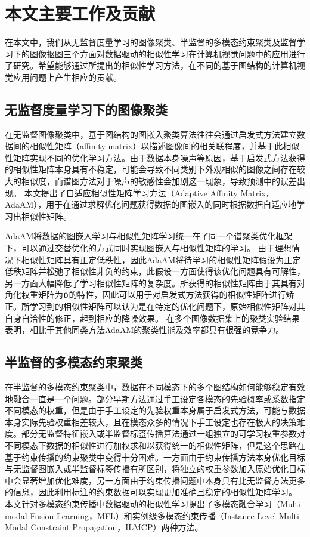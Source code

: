 \section{本文主要工作及贡献}
在本文中，我们从无监督度量学习的图像聚类、半监督的多模态约束聚类及监督学习下的图像抠图三个方面对数据驱动的相似性学习在计算机视觉问题中的应用进行了研究。希望能够通过所提出的相似性学习方法，在不同的基于图结构的计算机视觉应用问题上产生相应的贡献。

\subsection{无监督度量学习下的图像聚类}
在无监督图像聚类中，基于图结构的图嵌入聚类算法往往会通过启发式方法建立数据间的相似性矩阵（affinity matrix）以描述图像间的相关联程度，并基于此相似性矩阵实现不同的优化学习方法。由于数据本身噪声等原因，基于启发式方法获得的相似性矩阵本身具有不稳定，可能会导致不同类别下外观相似的图像之间存在较大的相似度，而谱图方法对于噪声的敏感性会加剧这一现象，导致预测中的误差出现。        
本文提出了自适应相似性矩阵学习方法（Adaptive Affinity Matrix，AdaAM），用于在通过求解优化问题获得数据的图嵌入的同时根据数据自适应地学习出相似性矩阵。

AdaAM将数据的图嵌入学习与相似性矩阵学习统一在了同一个谱聚类优化框架下，可以通过交替优化的方式同时实现图嵌入与相似性矩阵的学习。
由于理想情况下相似性矩阵具有正定低秩性，因此AdaAM将待学习的相似性矩阵假设为正定低秩矩阵并松弛了相似性非负的约束，此假设一方面使得该优化问题具有可解性，另一方面大幅降低了学习相似性矩阵的复杂度。所获得的相似性矩阵由于其具有对角化权重矩阵为${\bf0}$的特性，因此可以用于对启发式方法获得的相似性矩阵进行矫正。所学习到的相似性矩阵可以认为是在特定的优化问题下，原始相似性矩阵对其自身自洽性的修正，起到相应的降噪效果。
在多个图像数据集上的聚类实验结果表明，相比于其他同类方法AdaAM的聚类性能及效率都具有很强的竞争力。

\subsection{半监督的多模态约束聚类}
在半监督的多模态约束聚类中，数据在不同模态下的多个图结构如何能够稳定有效地融合一直是一个问题。部分早期方法通过手工设定各模态的先验概率或系数指定不同模态的权重，但是由于手工设定的先验权重本身属于启发式方法，可能与数据本身实际先验权重相差较大，且在模态众多的情况下手工设定也存在极大的决策难度。部分无监督特征嵌入或半监督标签传播算法通过一组独立的可学习权重参数对不同模态下数据的相似性进行加权求和以获得统一的相似性矩阵\cite{wang2009unified,xu2016discriminatively,xu2014multi}，但是这个思路在基于约束传播的约束聚类中变得十分困难。一方面由于约束传播方法本身优化目标与无监督图嵌入或半监督标签传播有所区别，将独立的权重参数加入原始优化目标中会显著增加优化难度，另一方面由于约束传播问题中本身具有比无监督方法更多的信息，因此利用标注的约束数据可以实现更加准确且稳定的相似性矩阵学习。    
本文针对多模态约束传播中数据驱动的相似性学习提出了多模态融合学习（Multi-modal Fusion Learning，MFL）和实例级多模态约束传播（Instance Level Multi-Modal Constraint Propagation，ILMCP）两种方法。

